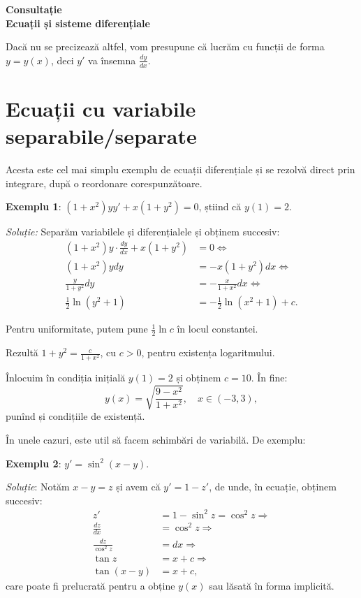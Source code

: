 \documentclass[11pt,a4paper]{article}
\theoremstyle{dotless}
\theoremstyle{dotlessdr}
\begin{document}
\begin{center}
  {\large\textbf{Consultație \\
      Ecuații și sisteme diferențiale }}
\end{center}

\vspace{2cm}

\tableofcontents

\newpage

{\color{red} Dacă nu se precizează altfel, vom presupune că lucrăm cu funcții
  de forma $y = y(x)$, deci $y'$ va însemna $\frac{dy}{dx}$.}

\section{Ecuații cu variabile separabile/separate}
\label{sec:sep}

Acesta este cel mai simplu exemplu de ecuații diferențiale și se rezolvă direct
prin integrare, după o reordonare corespunzătoare.

\textbf{Exemplu 1}: $(1 + x^2) yy' + x(1 + y^2) = 0$, știind că $y(1) = 2$.

\emph{Soluție:} Separăm variabilele și diferențialele și obținem succesiv:
\begin{align*}
  (1 + x^2) y \cdot \frac{dy}{dx} + x(1 + y^2) &= 0 \Leftrightarrow\\
  (1 + x^2) y dy &= -x(1 + y^2) dx \Leftrightarrow \\
  \frac{y}{1 + y^2} dy &= -\frac{x}{1 + x^2} dx \Leftrightarrow \\
  \frac{1}{2} \ln (y^2 + 1) &= -\frac{1}{2} \ln(x^2 + 1) + c.
\end{align*}

Pentru uniformitate, putem pune $\frac{1}{2} \ln c$ în locul constantei.

Rezultă $1 + y^2 = \frac{c}{1 + x^2}$, cu $c > 0$, pentru existența logaritmului.

Înlocuim în condiția inițială $y(1) = 2$ și obținem $c = 10$. În fine:
\[
  y(x) = \sqrt{\frac{9 - x^2}{1 + x^2}}, \quad x \in (-3, 3),
\]
punînd și condițiile de existență.

\vspace{2cm}

În unele cazuri, este util să facem schimbări de variabilă. De exemplu:

\textbf{Exemplu 2}: $y' = \sin^2(x - y)$.

\emph{Soluție}: Notăm $x - y = z$ și avem că $y' = 1 - z'$, de unde, în
ecuație, obținem succesiv:
\begin{align*}
  z' & = 1 - \sin^2 z = \cos^2 z \Rightarrow\\
  \frac{dz}{dx} &= \cos^2 z \Rightarrow \\
  \frac{dz}{\cos^2 z} &= dx \Rightarrow \\
  \tan z &= x + c \Rightarrow \\
  \tan (x - y) &= x + c,
\end{align*}
care poate fi prelucrată pentru a obține $y(x)$ sau lăsată în forma implicită.
\end{document}
